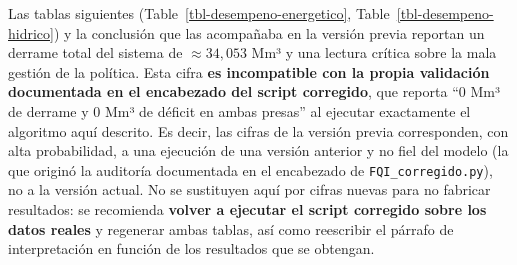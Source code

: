 \documentclass[
  letterpaper,
  DIV=11,
  numbers=noendperiod]{scrreprt}
\theoremstyle{definition}
\theoremstyle{remark}
\begin{document}
\begin{tcolorbox}[enhanced jigsaw, arc=.35mm, bottomrule=.15mm, bottomtitle=1mm, breakable, colback=white, colbacktitle=quarto-callout-warning-color!10!white, colframe=quarto-callout-warning-color-frame, coltitle=black, left=2mm, leftrule=.75mm, opacityback=0, opacitybacktitle=0.6, rightrule=.15mm, title=\textcolor{quarto-callout-warning-color}{\faExclamationTriangle}\hspace{0.5em}{Cifras pendientes de regenerar}, titlerule=0mm, toprule=.15mm, toptitle=1mm]

Las tablas siguientes (Table~\ref{tbl-desempeno-energetico},
Table~\ref{tbl-desempeno-hidrico}) y la conclusión que las acompañaba en
la versión previa reportan un derrame total del sistema de
\(\approx 34{,}053\) Mm³ y una lectura crítica sobre la mala gestión de
la política. Esta cifra \textbf{es incompatible con la propia validación
documentada en el encabezado del script corregido}, que reporta ``0 Mm³
de derrame y 0 Mm³ de déficit en ambas presas'' al ejecutar exactamente
el algoritmo aquí descrito. Es decir, las cifras de la versión previa
corresponden, con alta probabilidad, a una ejecución de una versión
anterior y no fiel del modelo (la que originó la auditoría documentada
en el encabezado de \texttt{FQI\_corregido.py}), no a la versión actual.
No se sustituyen aquí por cifras nuevas para no fabricar resultados: se
recomienda \textbf{volver a ejecutar el script corregido sobre los datos
reales} y regenerar ambas tablas, así como reescribir el párrafo de
interpretación en función de los resultados que se obtengan.

\end{tcolorbox}
\end{document}
